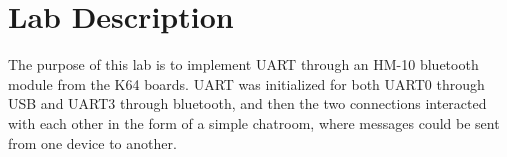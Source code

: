 \documentclass[CMPE]{KGCOEReport}
\begin{document}
\maketitle

\iffalse %
\tableofcontents	%
\newpage			%

\section*{Abstract}
\addcontentsline{toc}{section}{Abstract}
		
\section*{Design Methodology}
\addcontentsline{toc}{section}{Design Methodology}

\section*{Results \& Analysis}
\addcontentsline{toc}{section}{Results \& Analysis}

\section*{Conclusion}
\addcontentsline{toc}{section}{Conclusion}

\fi %
\section*{Lab Description}
The purpose of this lab is to implement UART through an HM-10 bluetooth module from the K64 boards. UART was initialized for both UART0 through USB and UART3 through bluetooth, and then the two connections interacted with each other in the form of a simple chatroom, where messages could be sent from one device to another. 
\end{document}
